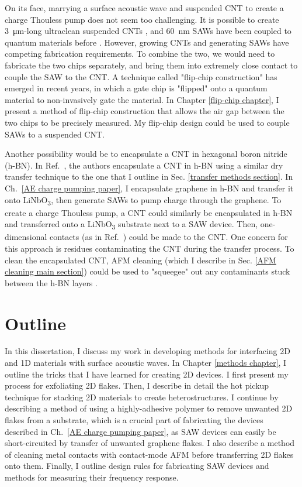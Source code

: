 \documentclass[double,12pt,1in,seploa]{beavtex}
\let\Oldsection\section
\renewcommand{\section}{\FloatBarrier\Oldsection}
\begin{document}
On its face, marrying a surface acoustic wave and suspended CNT to create a charge Thouless pump does not seem too challenging. It is possible to create \SI{3}{\micro\meter}-long ultraclean suspended CNTs \cite{senger_universal_2018}, and \SI{60}{\nano\meter} SAWs have been coupled to quantum materials before \cite{kukushkin_collective_2011}. However, growing CNTs and generating SAWs have competing fabrication requirements. To combine the two, we would need to fabricate the two chips separately, and bring them into extremely close contact to couple the SAW to the CNT. A technique called "flip-chip construction" has emerged in recent years, in which a gate chip is "flipped" onto a quantum material to non-invasively gate the material. In Chapter \ref{flip-chip chapter}, I present a method of flip-chip construction that allows the air gap between the two chips to be precisely measured. My flip-chip design could be used to couple SAWs to a suspended CNT.

Another possibility would be to encapsulate a CNT in hexagonal boron nitride (h-BN). In Ref.\ \cite{huang_superior_2015}, the authors encapsulate a CNT in h-BN using a similar dry transfer technique to the one that I outline in Sec. \ref{transfer methods section}. In Ch.\ \ref{AE charge pumping paper}, I encapsulate graphene in h-BN and transfer it onto LiNbO\textsubscript{3}, then generate SAWs to pump charge through the graphene. To create a charge Thouless pump, a CNT could similarly be encapsulated in h-BN and transferred onto a LiNbO\textsubscript{3} substrate next to a SAW device. Then, one-dimensional contacts (as in Ref.\ \cite{huang_superior_2015}) could be made to the CNT. One concern for this approach is residues contaminating the CNT during the transfer process. To clean the encapsulated CNT, AFM cleaning (which I describe in Sec. \ref{AFM cleaning main section}) could be used to "squeegee" out any contaminants stuck between the h-BN layers \cite{goossens_mechanical_2012,chen_tip-based_2021}. 


\section{Outline}
In this dissertation, I discuss my work in developing methods for interfacing 2D and 1D materials with surface acoustic waves. In Chapter \ref{methods chapter}, I outline the tricks that I have learned for creating 2D devices. I first present my process for exfoliating 2D flakes. Then, I describe in detail the hot pickup technique for stacking 2D materials to create heterostructures. I continue by describing a method of using a highly-adhesive polymer to remove unwanted 2D flakes from a substrate, which is a crucial part of fabricating the devices described in Ch.\ \ref{AE charge pumping paper}, as SAW devices can easily be short-circuited by transfer of unwanted graphene flakes. I also describe a method of cleaning metal contacts with contact-mode AFM before transferring 2D flakes onto them. Finally, I outline design rules for fabricating SAW devices and methods for measuring their frequency response. 
\end{document}
